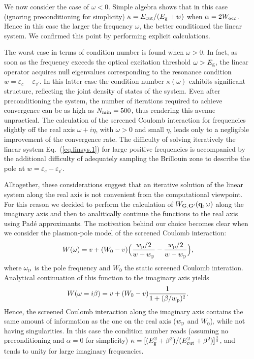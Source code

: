\documentclass[twocolumn,prb,showpacs,superscriptaddress]{revtex4}
\def\w{\omega}
\def\E{\varepsilon}
\def\vp{{v^\prime}}
\def\q{{\bf q}}
\def\G{{\bf G}}
\def\Gp{{\bf G^\prime}}
\begin{document}
We now consider the case of $\w<0$. Simple algebra shows that in this case
(ignoring preconditioning for simplicity) $\kappa = E_{\rm cut}/(E_{\rm g} + w)$
when $\alpha = 2W_{\rm occ}$. Hence in this case the larger the frequency $\w$,
the better conditioned the linear system. We confirmed this point
by performing explicit calculations.

The worst case in terms of condition number is found when $\w>0$. 
In fact, as soon as the frequency exceeds the optical excitation
threshold $\w>E_{\rm g}$, the linear operator acquires null eigenvalues 
corresponding to the resonance condition $w = \E_c - \E_\vp$. 
In this latter case the condition
number $\kappa(\w)$ exhibits significant structure, reflecting
the joint density of states of the system. Even after preconditioning the system, 
the number of iterations required to achieve convergence can be as high as 
$N_{\rm min} = 500$, thus rendering this avenue unpractical.
The calculation of the screened Coulomb interaction for frequencies slightly
off the real axis $\w+i\eta$, with $\w>0$ and small $\eta$, leads only to a negligible
improvement of the convergence rate.
The difficulty of solving iteratively the linear system Eq.\ (\ref{eq.linsys.1})
for large positive frequencies is accompanied by the additional difficulty 
of adequately sampling the Brillouin zone to describe the pole at $w = \E_c - \E_\vp$.

Alltogether, these considerations suggest that an iterative solution of the
linear system along the real axis is not convenient from the computational
viewpoint. For this reason we decided to perform the calculation of $W_{\G,\Gp}(\q,\w)$
along the imaginary axis and then to analitically continue the functions
to the real axis using Pad\'e approximants.\cite{pade1,pade2,pade3}
The motivation behind our choice becomes clear when we consider the
plasmon-pole model of the screened Coulomb interaction:\cite{hl86}
  \begin{equation}
  W(\w) = v + (W_0 -v) \Big( \frac{w_{\rm p}/2}{w+w_{\rm p}} - \frac{w_{\rm p}/2}{w-w_{\rm p}} \Big),
  \end{equation}
where $\w_{\rm p}$ is the pole frequency and $W_0$ the static screened Coulomb interation.
Analytical continuation of this function to the imaginary axis yields
  \begin{equation} \label{eq.pp.im}
  W(\w=i\beta) = v + (W_0 -v) \frac{1}{1+(\beta/w_{\rm p})^2}.
  \end{equation}
Hence, the screened Coulomb interaction along the imaginary axis contains the same
amount of information as the one on the real axis ($w_{\rm p}$ and $W_0$), while
not having singularities. In this case the condition number reads
(assuming no preconditioning and $\alpha=0$ for simplicity) 
$\kappa=[(E_{\rm g}^2+\beta^2)/(E_{\rm cut}^2+\beta^2)]^\frac{1}{2}$,
and tends to unity for large imaginary frequencies.
\end{document}
